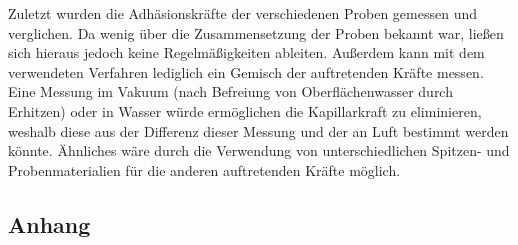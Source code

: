 \documentclass[
	a4paper,
	12pt,
	pagesize,
	ngerman
]{scrartcl}
\begin{document}
	Zuletzt wurden die Adhäsionskräfte der verschiedenen Proben gemessen und verglichen.
	Da wenig über die Zusammensetzung der Proben bekannt war, ließen sich hieraus jedoch keine Regelmäßigkeiten ableiten.
	Außerdem kann mit dem verwendeten Verfahren lediglich ein Gemisch der auftretenden Kräfte messen.
	Eine Messung im Vakuum (nach Befreiung von Oberflächenwasser durch Erhitzen) oder in Wasser würde ermöglichen die Kapillarkraft zu eliminieren, weshalb diese aus der Differenz dieser Messung und der an Luft bestimmt werden könnte.
	Ähnliches wäre durch die Verwendung von unterschiedlichen Spitzen- und Probenmaterialien für die anderen auftretenden Kräfte möglich.
	\printbibliography
	\subsection*{Anhang}
\end{document}
